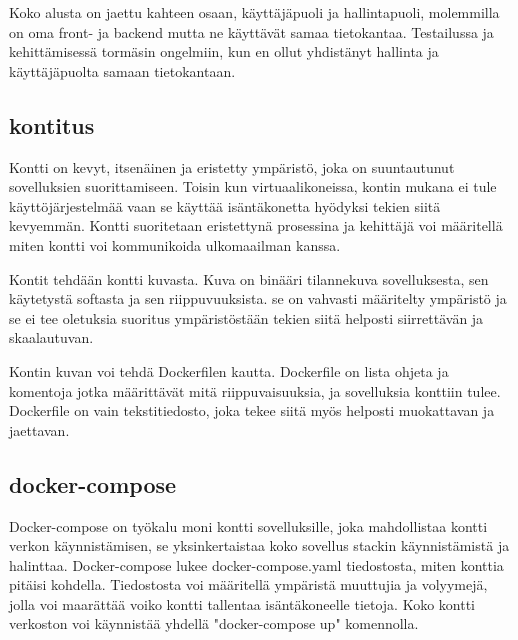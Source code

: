 


Koko alusta on jaettu kahteen osaan, käyttäjäpuoli ja hallintapuoli, molemmilla on oma front- ja backend mutta ne käyttävät samaa tietokantaa.
Testailussa ja kehittämisessä tormäsin ongelmiin, kun en ollut yhdistänyt hallinta ja käyttäjäpuolta samaan tietokantaan.




\subsection*{kontitus}




Kontti on kevyt, itsenäinen ja eristetty ympäristö, joka on suuntautunut sovelluksien suorittamiseen.
Toisin kun virtuaalikoneissa, kontin mukana ei tule käyttöjärjestelmää vaan se käyttää isäntäkonetta hyödyksi tekien siitä kevyemmän.
Kontti suoritetaan eristettynä prosessina ja kehittäjä voi määritellä miten kontti voi kommunikoida ulkomaailman kanssa.
\medskip

Kontit tehdään kontti kuvasta.
Kuva on binääri tilannekuva sovelluksesta, sen käytetystä softasta ja sen riippuvuuksista.
se on vahvasti määritelty ympäristö ja se ei tee oletuksia suoritus ympäristöstään tekien siitä helposti siirrettävän ja skaalautuvan.
\medskip

Kontin kuvan voi tehdä Dockerfilen kautta. Dockerfile on lista ohjeta ja komentoja jotka määrittävät mitä riippuvaisuuksia, ja sovelluksia konttiin tulee.
Dockerfile on vain tekstitiedosto, joka tekee siitä myös helposti muokattavan ja jaettavan.

\medskip






\subsection*{docker-compose}


Docker-compose on työkalu moni kontti sovelluksille, joka mahdollistaa kontti verkon käynnistämisen, se yksinkertaistaa koko sovellus stackin käynnistämistä ja halinttaa.
Docker-compose lukee docker-compose.yaml tiedostosta, miten konttia pitäisi kohdella.
Tiedostosta voi määritellä ympäristä muuttujia ja volyymejä, jolla voi maarättää voiko kontti tallentaa isäntäkoneelle tietoja.
Koko kontti verkoston voi käynnistää yhdellä "docker-compose up"{} komennolla.


